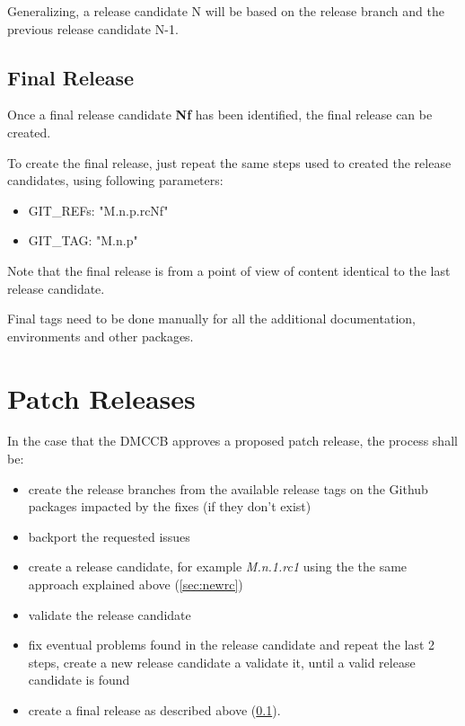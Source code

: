 Generalizing, a release candidate N will be based on the release branch and the previous release candidate N-1.


\subsection{Final Release} \label{sec:finalrelease}

Once a final release candidate \textbf{Nf} has been identified, the final release can be created.

To create the final release, just repeat the same steps used to created the release candidates, using following parameters:

\begin{itemize}
\item GIT\_REFs: "M.n.p.rcNf"
\item GIT\_TAG: "M.n.p"
\end{itemize}

Note that the final release is from a point of view of content identical to the last release candidate.

Final tags need to be done manually for all the additional documentation, environments and other packages.

\newpage

\section{Patch Releases} \label{sec:patchreleases}

In the case that the DMCCB approves a proposed patch release, the process shall be:

\begin{itemize}
\item create the release branches from the available release tags on the Github packages impacted by the fixes (if they don't exist)
\item backport the requested issues
\item create a release candidate, for example \textit{M.n.1.rc1} using the the same approach explained above (\ref{sec:newrc})
\item validate the release candidate
\item fix eventual problems found in the release candidate and repeat the last 2 steps, create a new release candidate a validate it, until a valid release candidate is found
\item create a final release as described above (\ref{sec:finalrelease}).
\end{itemize}


